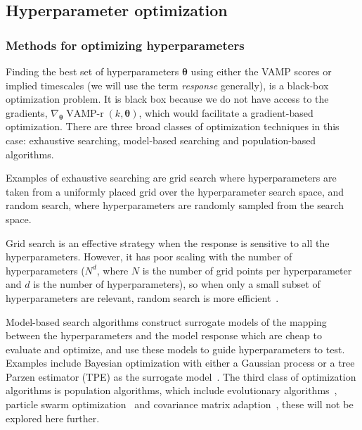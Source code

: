 \documentclass[journal=jacsat,manuscript=article]{achemso}
\begin{document}
 
\subsection{Hyperparameter optimization}

\subsubsection{Methods for optimizing hyperparameters}

Finding the best set of hyperparameters $\bm{\theta}$ using either the VAMP scores or implied timescales (we will use the term \emph{response} generally), is a black-box optimization problem.  It is black box because we do not have access to the gradients, $\nabla_{\bm{\theta}} \operatorname{VAMP-r}(k, \bm{\theta})$, which would facilitate a gradient-based optimization. There are three broad classes of optimization techniques in this case: exhaustive searching, model-based searching and population-based algorithms. 

Examples of exhaustive searching are grid search where hyperparameters are taken from a uniformly placed grid over the hyperparameter search space, and random search, where hyperparameters are randomly sampled from the search space. 

Grid search is an effective strategy when the response is sensitive to all the hyperparameters.  However, it has poor scaling with the number of hyperparameters ($N^d$, where $N$ is the number of grid points per hyperparameter and $d$ is the number of hyperparameters), so when only a small subset of hyperparameters are relevant, random search is more efficient~\cite{bergstra_jamesbergstra_random_2012}.  

Model-based search algorithms construct surrogate models of the mapping between the hyperparameters and the model response which are cheap to evaluate and optimize, and use these models to guide hyperparameters to test. Examples include Bayesian optimization with either a Gaussian process or a  tree Parzen estimator (TPE) as the surrogate model~\cite{bergstraAlgorithmsHyperParameterOptimizationa}.  The third class of optimization algorithms is population algorithms, which include evolutionary algorithms~\cite{simon2013evolutionary,eberhart1998comparison}, particle swarm optimization~\cite{kennedyParticleSwarmOptimization1995,eberhart1998comparison} and covariance matrix adaption~\cite{hansenCMAEvolutionStrategy2016}, these will not be explored here further. 
\end{document}
